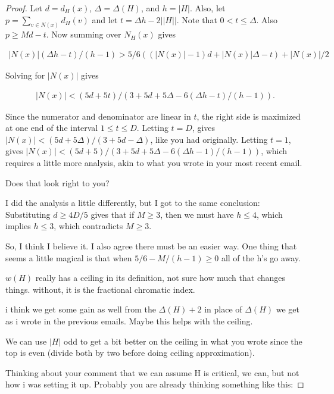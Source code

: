 \documentclass[12pt]{amsart}
\theoremstyle{plain}
\theoremstyle{definition}
\theoremstyle{remark}
\begin{document}
\begin{proof}
Let $d = d_H(x)$,  $\Delta = \Delta(H)$, and $h = |H|$. 
Also, let $p = \sum_{v \in N(x)} d_H(v)$ and
let $t = \Delta h-2||H||$.
Note that $0 < t \le \Delta$.  Also $p \ge Md - t$.  Now summing over $N_H(x)$
gives

\begin{align*}
|N(x)|(\Delta h-t)/(h-1) > 5/6((|N(x)|-1)d + |N(x)|\Delta - t) + |N(x)|/2
\end{align*}

Solving for $|N(x)|$ gives

\begin{align*}
|N(x)| < (5d+5t)/(3+5d+5\Delta-6(\Delta h-t)/(h-1)).
\end{align*}

Since the numerator and denominator are linear in $t$, the right side is
maximized at one end of the interval $1 \le t \le D$.  Letting $t = D$,
gives $|N(x)| < (5d+5\Delta)/(3+5d-\Delta)$, like you had originally.  Letting $t = 1$,
gives $|N(x)| < (5d+5)/(3+5d+5\Delta-6(\Delta h-1)/(h-1))$, which requires a little more
analysis, akin to what you wrote in your most recent email.

Does that look right to you?



I did the analysis a little differently, but I got to the same
conclusion: Substituting $d \ge 4D/5$ gives that if $M \ge 3$, then we
must have $h \le 4$, which implies $h \le 3$, which contradicts $M \ge 3$.

So, I think I believe it.  I also agree there must be an easier way.
One thing that seems a little magical is that when $5/6 - M/(h-1) \ge 0$
all of the h's go away.

$w(H)$ really has a ceiling in its definition, not sure how much that changes
things.   without, it is the fractional chromatic index.

i think we get some gain as well from the $\Delta(H) + 2$ in place of $\Delta(H)$
we get as i wrote in the previous emails.   Maybe this helps with the ceiling.

We can use $|H|$ odd to get a bit better on the ceiling in what you wrote since the top is even (divide both by two before doing ceiling approximation).

Thinking about your comment that we can assume H is critical, we can,  but not how i was setting it up.   Probably you are already thinking something like this:


\end{proof}
\end{document}
